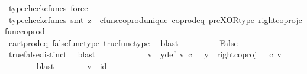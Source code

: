 \begin{isabellebody}
\ {\isacharparenleft}{\kern0pt}typecheck{\isacharunderscore}{\kern0pt}cfuncs{\isacharcomma}{\kern0pt}\ force{\isacharparenright}{\kern0pt}\isanewline
\ \ \ \ \ \ \isamarkupfalse%
\ \isamarkupfalse%
\ {\isachardoublequoteopen}{\isasymlangle}{\isasymt}{\isacharcomma}{\kern0pt}{\isasymf}{\isasymrangle}\ {\isacharequal}{\kern0pt}\ {\isasymlangle}{\isasymf}{\isacharcomma}{\kern0pt}{\isasymt}{\isasymrangle}{\isachardoublequoteclose}\isanewline
\ \ \ \ \ \ \ \ \isamarkupfalse%
\ {\isacharparenleft}{\kern0pt}typecheck{\isacharunderscore}{\kern0pt}cfuncs{\isacharcomma}{\kern0pt}\ smt\ {\isacharparenleft}{\kern0pt}z{}{\isacharparenright}{\kern0pt}\ \ cfunc{\isacharunderscore}{\kern0pt}coprod{\isacharunderscore}{\kern0pt}unique\ coprod{\isacharunderscore}{\kern0pt}eq{}\ pre{\isacharunderscore}{\kern0pt}XOR{\isacharunderscore}{\kern0pt}type\ right{\isacharunderscore}{\kern0pt}coproj{\isacharunderscore}{\kern0pt}cfunc{\isacharunderscore}{\kern0pt}coprod{\isacharparenright}{\kern0pt}\ \ \ \ \ \ \isanewline
\ \ \ \ \ \ \isamarkupfalse%
\ \isamarkupfalse%
\ {\isachardoublequoteopen}{\isasymt}\ {\isacharequal}{\kern0pt}\ {\isasymf}\ {\isasymand}\ {\isasymf}\ {\isacharequal}{\kern0pt}\ {\isasymt}{\isachardoublequoteclose}\isanewline
\ \ \ \ \ \ \ \ \isamarkupfalse%
\ cart{\isacharunderscore}{\kern0pt}prod{\isacharunderscore}{\kern0pt}eq{}\ false{\isacharunderscore}{\kern0pt}func{\isacharunderscore}{\kern0pt}type\ true{\isacharunderscore}{\kern0pt}func{\isacharunderscore}{\kern0pt}type\ \isamarkupfalse%
\ blast\isanewline
\ \ \ \ \ \ \isamarkupfalse%
\ \isamarkupfalse%
\ False\isanewline
\ \ \ \ \ \ \ \ \isamarkupfalse%
\ true{\isacharunderscore}{\kern0pt}false{\isacharunderscore}{\kern0pt}distinct\ \isamarkupfalse%
\ blast\isanewline
\ \ \ \ \isamarkupfalse%
\isanewline
\ \ \ \ \isamarkupfalse%
\ \isamarkupfalse%
\ v\ \ y{\isacharunderscore}{\kern0pt}def{\isacharcolon}{\kern0pt}\ {\isachardoublequoteopen}v\ {\isasymin}\isactrlsub c\ {\isasymone}\ {\isasymand}\ y\ {\isacharequal}{\kern0pt}\ right{\isacharunderscore}{\kern0pt}coproj\ {\isasymone}\ {\isasymone}\ {\isasymcirc}\isactrlsub c\ v{\isachardoublequoteclose}\isanewline
\ \ \ \ \ \ \isamarkupfalse%
\ blast\isanewline
\ \ \ \ \isamarkupfalse%
\ \isamarkupfalse%
\ {\isachardoublequoteopen}v\ {\isacharequal}{\kern0pt}\ id\ {\isasymone}{\isachardoublequoteclose}\isanewline

\end{isabellebody}
